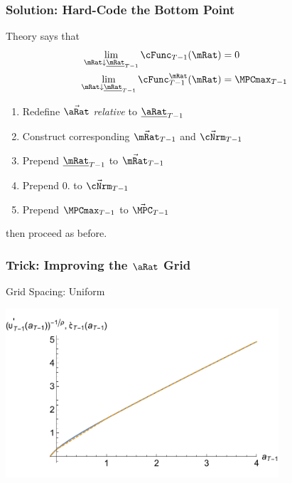 \documentclass{beamer}
\begin{document}
\begin{frame}
\frametitle{Solution: Hard-Code the Bottom Point}

Theory says that
\begin{equation}\begin{gathered}\begin{aligned}
  \lim_{\mRat \downarrow \underline{\mRat}_{T-1}} \cFunc_{T-1}(\mRat)  & = 0
\\ \lim_{\mRat \downarrow \underline{\mRat}_{T-1}} \cFunc_{T-1}^{\mRat}(\mRat)  & = \MPCmax_{T-1}
\end{aligned}\end{gathered}\end{equation}

\medskip 

\begin{enumerate}
\item Redefine $\vec{\aRat}$ {\it relative} to $\uline{\aRat}_{T-1}$
\item Construct corresponding $\vec{\mRat}_{T-1}$ and $\vec{\cNrm}_{T-1}$
\item Prepend $\uline{\mRat}_{T-1}$ to $\vec{\mRat}_{T-1}$
\item Prepend $0.$ to $\vec{\cNrm}_{T-1}$
\item Prepend $\MPCmax_{T-1}$ to $\vec{\MPC}_{T-1}$
\end{enumerate}
then proceed as before.

\end{frame}

\begin{frame}
\frametitle{Trick: Improving the $\aRat$ Grid}
Grid Spacing: Uniform

\includegraphics[width=4in]{./Figures/GothVInvVSGothC.pdf}

\end{frame}
\end{document}
